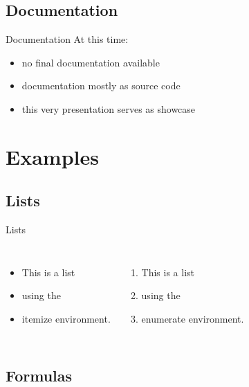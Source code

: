 \documentclass[fleqn,compress,utf8,aspectratio=169,t]{beamer}
\begin{document}
\subsection{Documentation}

\begin{frame}{Documentation}
  At this time:
  \begin{itemize}
    \item<1-> no final documentation available
    \item<2-> documentation mostly as source code
    \item<3-> this very presentation serves as showcase
  \end{itemize}

\end{frame}


\section{Examples}

\subsection{Lists}

\begin{frame}{Lists}
  \begin{columns}[t]
    \begin{itemize}
      \item This is a list
      \item using the
      \item itemize environment.
    \end{itemize}
    \begin{enumerate}
      \item This is a list
      \item using the
      \item enumerate environment.
    \end{enumerate}
  \end{columns}
\end{frame}

\subsection{Formulas}
\end{document}
